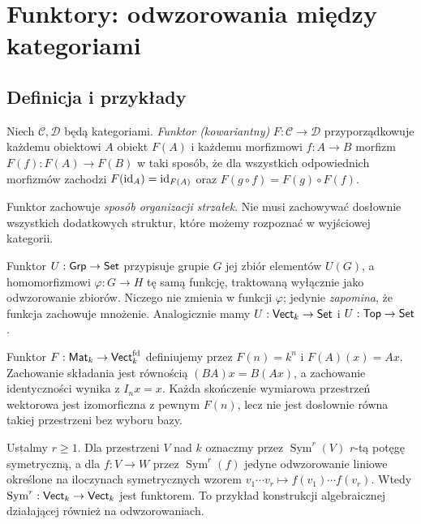 \section{Funktory: odwzorowania między kategoriami}\label{sec:funktory}

\subsection{Definicja i przykłady}

\begin{definicja}\label{def:funktor}
Niech $\mathcal C,\mathcal D$ będą kategoriami. \emph{Funktor (kowariantny)} $F:\mathcal C\to\mathcal D$ przyporządkowuje każdemu obiektowi $A$ obiekt $F(A)$ i każdemu morfizmowi $f:A\to B$ morfizm $F(f):F(A)\to F(B)$ w taki sposób, że dla wszystkich odpowiednich morfizmów zachodzi $F(\mathrm{id}_A)=\mathrm{id}_{F(A)}$ oraz $F(g\circ f)=F(g)\circ F(f)$.
\end{definicja}

Funktor zachowuje \emph{sposób organizacji strzałek}. Nie musi zachowywać dosłownie wszystkich dodatkowych struktur, które możemy rozpoznać w wyjściowej kategorii.

\begin{przyklad}
Funktor $U:\mathsf{Grp}\to\mathsf{Set}$ przypisuje grupie $G$ jej zbiór elementów $U(G)$, a homomorfizmowi $\varphi:G\to H$ tę samą funkcję, traktowaną wyłącznie jako odwzorowanie zbiorów. Niczego nie zmienia w funkcji $\varphi$; jedynie \emph{zapomina}, że funkcja zachowuje mnożenie. Analogicznie mamy $U:\mathsf{Vect}_k\to\mathsf{Set}$ i $U:\mathsf{Top}\to\mathsf{Set}$.
\end{przyklad}

\begin{przyklad}
Funktor $F:\mathsf{Mat}_k\to\mathsf{Vect}_k^{\mathrm{fd}}$ definiujemy przez $F(n)=k^n$ i $F(A)(x)=Ax$. Zachowanie składania jest równością $(BA)x=B(Ax)$, a zachowanie identyczności wynika z $I_nx=x$. Każda skończenie wymiarowa przestrzeń wektorowa jest izomorficzna z pewnym $F(n)$, lecz nie jest dosłownie równa takiej przestrzeni bez wyboru bazy.
\end{przyklad}

\begin{przyklad}
Ustalmy $r\geq1$. Dla przestrzeni $V$ nad $k$ oznaczmy przez $\operatorname{Sym}^r(V)$ $r$-tą potęgę symetryczną, a dla $f:V\to W$ przez $\operatorname{Sym}^r(f)$ jedyne odwzorowanie liniowe określone na iloczynach symetrycznych wzorem $v_1\cdots v_r\mapsto f(v_1)\cdots f(v_r)$. Wtedy $\operatorname{Sym}^r:\mathsf{Vect}_k\to\mathsf{Vect}_k$ jest funktorem. To przykład konstrukcji algebraicznej działającej również na odwzorowaniach.
\end{przyklad}

